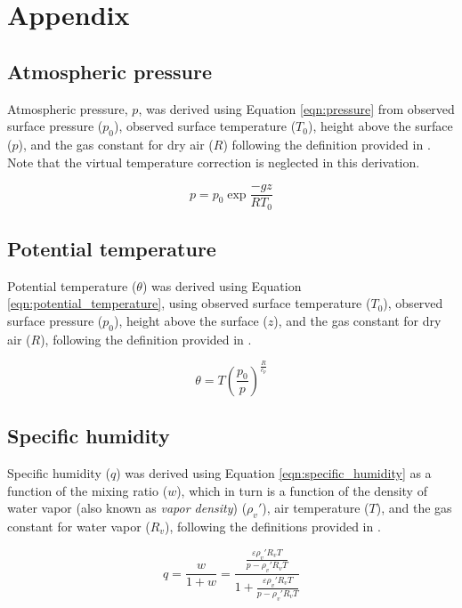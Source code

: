\section*{Appendix} \label{section:appendix}

\subsection*{Atmospheric pressure}

Atmospheric pressure, $p$, was derived using Equation \ref{eqn:pressure} from observed surface pressure ($p_0$), observed surface temperature ($T_0$), height above the surface ($p$), and the gas constant for dry air ($R$) following the definition provided in \citet{wallace2006}. Note that the virtual temperature correction is neglected in this derivation.

\begin{equation*}\label{eqn:pressure}
	p = p_0 \exp{\frac{-g z}{R T_0}}
\end{equation*}

\subsection*{Potential temperature}

Potential temperature ($\theta$) was derived using Equation \ref{eqn:potential_temperature}, using observed surface temperature ($T_0$), observed surface pressure ($p_0$), height above the surface ($z$), and the gas constant for dry air ($R$), following the definition provided in \citet{wallace2006}.

\begin{equation*}\label{eqn:potential_temperature}
	\theta = T \left(\frac{p_0}{p} \right)^{\frac{R}{c_p}}
\end{equation*}

\subsection*{Specific humidity}

Specific humidity ($q$) was derived using Equation \ref{eqn:specific_humidity} as a function of the mixing ratio ($w$), which in turn is a function of the density of water vapor (also known as \textit{vapor density}) ($\rho_v'$), air temperature ($T$), and the gas constant for water vapor ($R_v$), following the definitions provided in \citet{wallace2006}. 

\begin{equation*}\label{eqn:specific_humidity}
	q = \frac{w}{1+w} = \frac{\frac{\varepsilon \rho_v' R_v T}{p - \rho_v' R_v T}}{1+\frac{\varepsilon \rho_v' R_v T}{p - \rho_v' R_v T}} 
\end{equation*}

